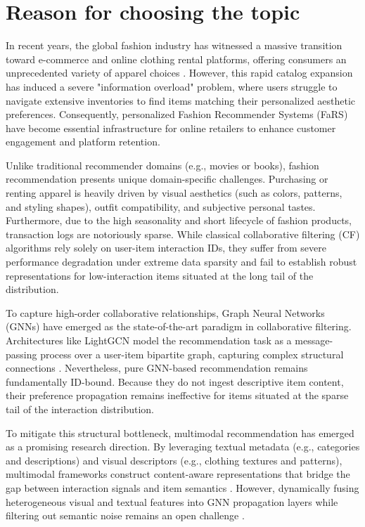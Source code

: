 \section{Reason for choosing the topic}

In recent years, the global fashion industry has witnessed a massive transition toward e-commerce and online clothing rental platforms, offering consumers an unprecedented variety of apparel choices \parencite{article1}. However, this rapid catalog expansion has induced a severe "information overload" problem, where users struggle to navigate extensive inventories to find items matching their personalized aesthetic preferences. Consequently, personalized Fashion Recommender Systems (FaRS) have become essential infrastructure for online retailers to enhance customer engagement and platform retention.

Unlike traditional recommender domains (e.g., movies or books), fashion recommendation presents unique domain-specific challenges. Purchasing or renting apparel is heavily driven by visual aesthetics (such as colors, patterns, and styling shapes), outfit compatibility, and subjective personal tastes. Furthermore, due to the high seasonality and short lifecycle of fashion products, transaction logs are notoriously sparse. While classical collaborative filtering (CF) algorithms rely solely on user-item interaction IDs, they suffer from severe performance degradation under extreme data sparsity and fail to establish robust representations for low-interaction items situated at the long tail of the distribution.

To capture high-order collaborative relationships, Graph Neural Networks (GNNs) have emerged as the state-of-the-art paradigm in collaborative filtering. Architectures like LightGCN \parencite{he2020lightgcnsimplifyingpoweringgraph} model the recommendation task as a message-passing process over a user-item bipartite graph, capturing complex structural connections \parencite{11359174}. Nevertheless, pure GNN-based recommendation remains fundamentally ID-bound. Because they do not ingest descriptive item content, their preference propagation remains ineffective for items situated at the sparse tail of the interaction distribution.

To mitigate this structural bottleneck, multimodal recommendation has emerged as a promising research direction. By leveraging textual metadata (e.g., categories and descriptions) and visual descriptors (e.g., clothing textures and patterns), multimodal frameworks construct content-aware representations that bridge the gap between interaction signals and item semantics \parencite{10.1145/3543507.3583251}. However, dynamically fusing heterogeneous visual and textual features into GNN propagation layers while filtering out semantic noise remains an open challenge \parencite{Zhou_2023, 10.1007/978-981-95-3355-8_6}.

